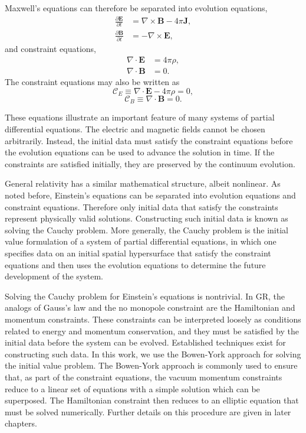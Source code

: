 Maxwell's equations can therefore be separated into evolution equations,
\begin{align}
\frac{\partial \mathbf{E}}{\partial t} &= \nabla \times \mathbf{B} - 4\pi \mathbf{J}, \\
\frac{\partial \mathbf{B}}{\partial t} &= -\nabla \times \mathbf{E},
\end{align}
and constraint equations,
\begin{align}
\nabla \cdot \mathbf{E} &= 4\pi \rho, \\
\nabla \cdot \mathbf{B} &= 0.
\end{align}
The constraint equations may also be written as
\begin{equation}
\mathcal{C}_E \equiv \nabla \cdot \mathbf{E} - 4\pi \rho = 0,
\end{equation}
\begin{equation}
\mathcal{C}_B \equiv \nabla \cdot \mathbf{B} = 0.
\end{equation}

These equations illustrate an important feature of many systems of partial differential equations. The electric and magnetic fields cannot be chosen arbitrarily. Instead, the initial data must satisfy the constraint equations before the evolution equations can be used to advance the solution in time. If the constraints are satisfied initially, they are preserved by the continuum evolution. 

General relativity has a similar mathematical structure, albeit nonlinear. As noted before, Einstein's equations can be separated into evolution equations and constraint equations. Therefore only initial data that satisfy the constraints represent physically valid solutions. Constructing such initial data is known as solving the Cauchy problem. More generally, the Cauchy problem is the initial value formulation of a system of partial differential equations, in which one specifies data on an initial spatial hypersurface that satisfy the constraint equations and then uses the evolution equations to determine the future development of the system.

Solving the Cauchy problem for Einstein's equations is nontrivial. In GR, the analogs of Gauss's law and the no monopole constraint are the Hamiltonian and momentum constraints. These constraints can be interpreted loosely as conditions related to energy and momentum conservation, and they must be satisfied by the initial data before the system can be evolved. Established techniques exist for constructing such data. In this work, we use the Bowen-York approach for solving the initial value problem. The Bowen-York approach is commonly used to ensure that, as part of the constraint equations, the vacuum momentum constraints reduce to a linear set of equations with a simple solution which can be superposed.  The Hamiltonian constraint then reduces to an elliptic equation that must be solved numerically. Further details on this procedure are given in later chapters.

